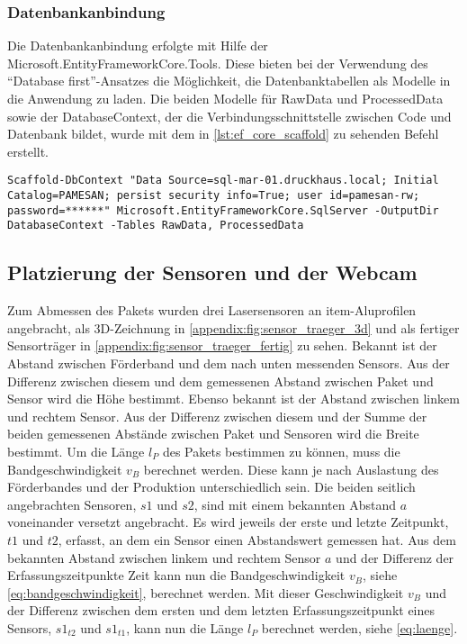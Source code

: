 \subsubsection{Datenbankanbindung}

Die Datenbankanbindung erfolgte mit Hilfe der Microsoft.EntityFrameworkCore.Tools. Diese bieten bei der Verwendung des \enquote{Database first}-Ansatzes die Möglichkeit, die Datenbanktabellen als Modelle in die Anwendung zu laden. Die beiden Modelle für RawData und ProcessedData sowie der DatabaseContext, der die Verbindungsschnittstelle zwischen Code und Datenbank bildet, wurde mit dem in \vref{lst:ef_core_scaffold} zu sehenden Befehl erstellt.

\begin{lstlisting}[style=bash-style,
    caption={Portierungsbefehl der Datenbanktabellen zu C\#-Modellen},
    breaklines=true,
    label={lst:ef_core_scaffold}]
    Scaffold-DbContext "Data Source=sql-mar-01.druckhaus.local; Initial Catalog=PAMESAN; persist security info=True; user id=pamesan-rw; password=******" Microsoft.EntityFrameworkCore.SqlServer -OutputDir DatabaseContext -Tables RawData, ProcessedData
\end{lstlisting}


\subsection{Platzierung der Sensoren und der Webcam}\label{ssec:platzierung_sensoren}

Zum Abmessen des Pakets wurden drei Lasersensoren an item-Aluprofilen angebracht, als 3D-Zeichnung in \vref{appendix:fig:sensor_traeger_3d} und als fertiger Sensorträger in \vref{appendix:fig:sensor_traeger_fertig} zu sehen.
Bekannt ist der Abstand zwischen Förderband und dem nach unten messenden Sensors. Aus der Differenz zwischen diesem und dem gemessenen Abstand zwischen Paket und Sensor wird die Höhe bestimmt. Ebenso bekannt ist der Abstand zwischen linkem und rechtem Sensor. Aus der Differenz zwischen diesem und der Summe der beiden gemessenen Abstände zwischen Paket und Sensoren wird die Breite bestimmt.
Um die Länge $l_P$ des Pakets bestimmen zu können, muss die Bandgeschwindigkeit $v_B$ berechnet werden.
Diese kann je nach Auslastung des Förderbandes und der Produktion unterschiedlich sein.
Die beiden seitlich angebrachten Sensoren, $s1$ und $s2$, sind mit einem bekannten Abstand $a$ voneinander versetzt angebracht.
Es wird jeweils der erste und letzte Zeitpunkt, $t1$ und $t2$, erfasst, an dem ein Sensor einen Abstandswert gemessen hat.
Aus dem bekannten Abstand zwischen linkem und rechtem Sensor $a$ und der Differenz der Erfassungszeitpunkte Zeit kann nun die Bandgeschwindigkeit $v_B$, siehe \vref{eq:bandgeschwindigkeit}, berechnet werden. Mit dieser Geschwindigkeit $v_B$ und der Differenz zwischen dem ersten und dem letzten Erfassungszeitpunkt eines Sensors, $s1_{t2}$ und $s1_{t1}$, kann nun die Länge $l_P$ berechnet werden, siehe \vref{eq:laenge}.

